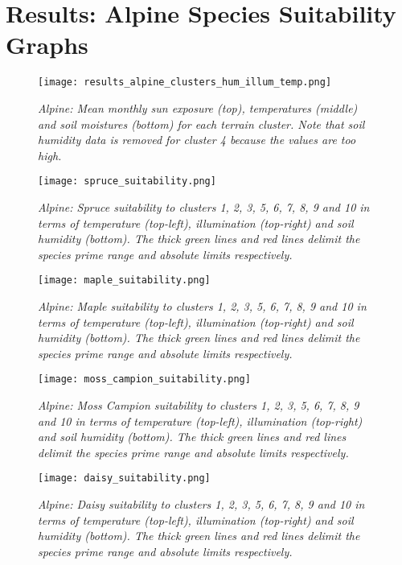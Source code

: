 \chapter{Results: Alpine Species Suitability Graphs} \label{AppendixI}

\begin{figure}[htb!]
\center
	\texttt{[image: results\_alpine\_clusters\_hum\_illum\_temp.png]}
	\caption{ \textit{Alpine: Mean monthly sun exposure (top), temperatures (middle) and soil moistures (bottom) for each terrain cluster. Note that soil humidity data is removed for cluster 4 because the values are too high.}}
	\label{fig:results_alpine_cluster_hum_temp_illum}
\end{figure}

\begin{figure}[htb!]
\center
	\texttt{[image: spruce\_suitability.png]}
	\caption{ \textit{Alpine: Spruce suitability to clusters 1, 2, 3, 5, 6, 7, 8, 9 and 10 in terms of temperature (top-left), illumination (top-right) and soil humidity (bottom). The thick green lines and red lines delimit the species prime range and absolute limits respectively.}}
	\label{fig:results_alpine_spruce_suitability}
\end{figure}

\begin{figure}[htb!]
\center
	\texttt{[image: maple\_suitability.png]}
	\caption{ \textit{Alpine: Maple suitability to clusters 1, 2, 3, 5, 6, 7, 8, 9 and 10 in terms of temperature (top-left), illumination (top-right) and soil humidity (bottom). The thick green lines and red lines delimit the species prime range and absolute limits respectively.}}
	\label{fig:results_alpine_maple_suitability}
\end{figure}

\begin{figure}[htb!]
\center
	\texttt{[image: moss\_campion\_suitability.png]}
	\caption{ \textit{Alpine: Moss Campion suitability to clusters 1, 2, 3, 5, 6, 7, 8, 9 and 10 in terms of temperature (top-left), illumination (top-right) and soil humidity (bottom). The thick green lines and red lines delimit the species prime range and absolute limits respectively.}}
	\label{fig:results_alpine_moss_campion_suitability}
\end{figure}

\begin{figure}[htb!]
\center
	\texttt{[image: daisy\_suitability.png]}
	\caption{ \textit{Alpine: Daisy suitability to clusters 1, 2, 3, 5, 6, 7, 8, 9 and 10 in terms of temperature (top-left), illumination (top-right) and soil humidity (bottom). The thick green lines and red lines delimit the species prime range and absolute limits respectively.}}
	\label{fig:results_alpine_daisy_suitability}
\end{figure}

